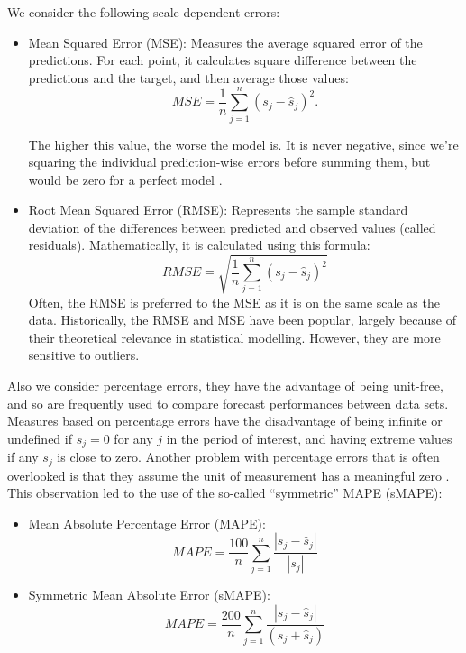 We consider the following scale-dependent errors:
\begin{itemize}
	\item Mean Squared Error (MSE): Measures the average squared error of the predictions. For each point, it calculates square difference between the predictions and the target, and then average those values:
	\begin{equation}
	MSE = \frac{1}{n} \sum_{j=1}^{n} \left(s_j - \hat{s}_j\right)^{2}.
	\end{equation}
	
	The higher this value, the worse the model is. It is never negative, since we're squaring the individual prediction-wise errors before summing them, but would be zero for a perfect model .
	
	\item Root Mean Squared Error (RMSE): Represents the sample standard deviation of the differences between predicted and observed values (called residuals). Mathematically, it is calculated using this formula:
	\begin{equation}
	RMSE = \sqrt{\frac{1}{n} \sum_{j=1}^{n} \left(s_j - \hat{s}_j\right)^2}
	\end{equation}
	Often, the RMSE is preferred to the MSE as it is on the same scale as the data. Historically, the RMSE and MSE have been popular, largely because of their theoretical relevance in statistical modelling. However, they are more sensitive to outliers.
\end{itemize}

Also we consider percentage errors, they have the advantage of being unit-free, and so are frequently used to compare forecast performances between data sets. Measures based on percentage errors have the disadvantage of being infinite or undefined if $s_{j}=0$ for any $j$ in the period of interest, and having extreme values if any $s_{j}$ is close to zero. Another problem with percentage errors that is often overlooked is that they assume the unit of measurement has a meaningful zero \cite{Hyndman2006}. This observation led to the use of the so-called ``symmetric'' MAPE (sMAPE):

\begin{itemize}	
	\item Mean Absolute Percentage Error (MAPE):
	\begin{equation}
	MAPE = \frac{100}{n}\sum_{j=1}^{n} \frac{\left|s_j - \hat{s}_j\right|}{|s_j|}
	\end{equation}	
	\item Symmetric Mean Absolute Error (sMAPE):	
	\begin{equation}
	MAPE = \frac{200}{n}\sum_{j=1}^{n} \frac{\left|s_j - \hat{s}_j\right|}{\left(s_{j}+\hat{s}_{j}\right)}
	\end{equation}	
	
\end{itemize}


